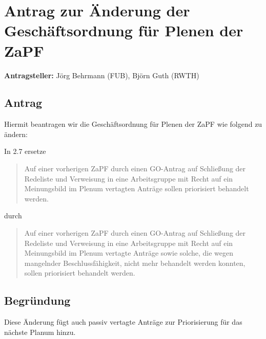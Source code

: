 \documentclass[draft,10pt,oneside]{scrartcl}
\begin{document}
\section*{Antrag zur Änderung der Geschäftsordnung für Plenen der ZaPF}

\textbf{Antragsteller:} Jörg Behrmann (FUB), Björn Guth (RWTH)

\subsection*{Antrag}

Hiermit beantragen wir die Geschäftsordnung für Plenen der ZaPF wie folgend zu
ändern:

In 2.7 ersetze
\begin{quote}
	Auf einer vorherigen ZaPF durch einen GO-Antrag auf \glqq{}Schließung der
	Redeliste und Verweisung in eine Arbeitsgruppe mit Recht auf ein
	Meinungsbild im Plenum\grqq{} vertagten Anträge sollen priorisiert
	behandelt werden.
\end{quote}
durch
\begin{quote}
	Auf einer vorherigen ZaPF durch einen GO-Antrag auf \glqq{}Schließung der
	Redeliste und Verweisung in eine Arbeitsgruppe mit Recht auf ein
	Meinungsbild im Plenum\grqq{} vertagte Anträge sowie solche, die wegen
	mangelnder Beschlussfähigkeit, nicht mehr behandelt werden konnten, sollen
	priorisiert behandelt werden.
\end{quote}

\subsection*{Begründung}
Diese Änderung fügt auch passiv vertagte Anträge zur Priorisierung für das
nächste Planum hinzu.
\end{document}
